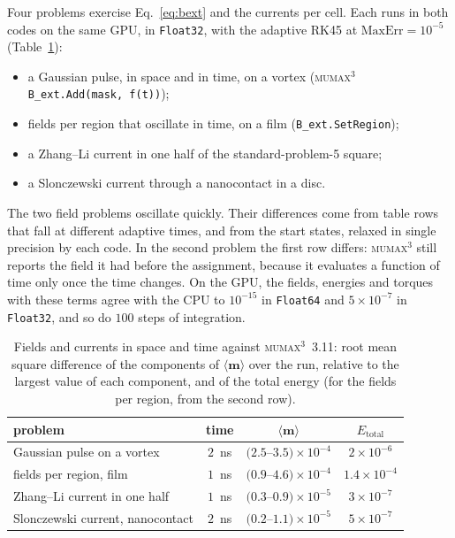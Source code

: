 \documentclass{article}      %
\newcommand{\mumax}{\textsc{mumax}$^3$}
\newcommand{\vm}{\bm{m}}
\begin{document}
Four problems exercise Eq.~\eqref{eq:bext} and the currents per cell. Each runs in
both codes on the same GPU, in \texttt{Float32}, with the adaptive RK45 at
$\mathrm{MaxErr}=10^{-5}$ (Table~\ref{tab:fields}):
%
\begin{itemize}
  \item a Gaussian pulse, in space and in time, on a vortex
        (\mumax{} \texttt{B\_ext.Add(mask, f(t))});
  \item fields per region that oscillate in time, on a film
        (\texttt{B\_ext.SetRegion});
  \item a Zhang--Li current in one half of the standard-problem-5 square;
  \item a Slonczewski current through a nanocontact in a disc.
\end{itemize}
%
The two field problems oscillate quickly. Their differences come from table rows
that fall at different adaptive times, and from the start states, relaxed in single
precision by each code. In the second problem the first row differs: \mumax{} still
reports the field it had before the assignment, because it evaluates a function of
time only once the time changes. On the GPU, the fields, energies and torques with
these terms agree with the CPU to $10^{-15}$ in \texttt{Float64} and
$5\times10^{-7}$ in \texttt{Float32}, and so do $100$ steps of integration.

\begin{table}[t]
  \centering
  \caption{Fields and currents in space and time against \mumax{}~3.11: root mean
  square difference of the components of $\langle\vm\rangle$ over the run, relative
  to the largest value of each component, and of the total energy (for the fields
  per region, from the second row).}
  \label{tab:fields}
  \begin{tabular}{lccc}
    \hline
    problem & time & $\langle\vm\rangle$ & $E_{\mathrm{total}}$ \\
    \hline
    Gaussian pulse on a vortex       & $2$~ns & $(2.5$--$3.5)\times10^{-4}$ & $2\times10^{-6}$ \\
    fields per region, film          & $1$~ns & $(0.9$--$4.6)\times10^{-4}$ & $1.4\times10^{-4}$ \\
    Zhang--Li current in one half    & $1$~ns & $(0.3$--$0.9)\times10^{-5}$ & $3\times10^{-7}$ \\
    Slonczewski current, nanocontact & $2$~ns & $(0.2$--$1.1)\times10^{-5}$ & $5\times10^{-7}$ \\
    \hline
  \end{tabular}
\end{table}
\end{document}
